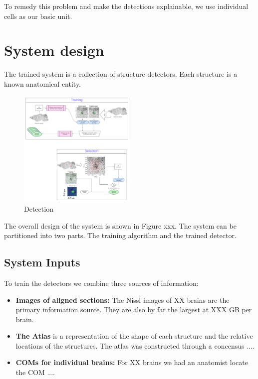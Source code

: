 \documentclass[runningheads]{llncs}
\begin{document}
\begin{enumerate}
To remedy this problem and make the detections explainable, we use individual cells as our basic unit. 
\end{enumerate}

\section{System design}

The trained system is a collection of structure detectors. Each structure is a known anatomical entity. 
\begin{figure}
\centering
\includegraphics[width=0.5\textwidth]{figures/detection.pdf}
\caption{Detection \label{fig:detect}}
\end{figure}


The overall design of the system is shown in Figure xxx. The system can be partitioned into two parts. The training algorithm and the trained detector.

\subsection{System Inputs}
To train the detectors we combine three sources of information:
\begin{itemize}
    \item {\bf Images of aligned sections:} The Nissl images of XX brains are the primary information source. They are also by far the largest at XXX GB per brain.
    \item {\bf The Atlas} is a representation of the shape of each structure and the relative locations of the structures. The atlas was constructed through a concensus ....
    \item {\bf COMs for individual brains:} For XX brains we had an anatomist locate the COM ....
\end{itemize}
\end{document}
